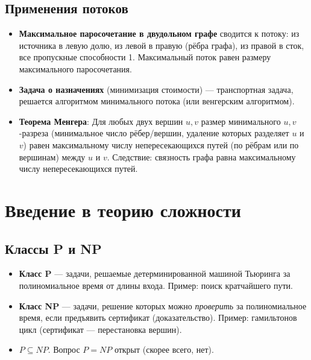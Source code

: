 \documentclass[12pt]{article}
\begin{document}
\begin{enumerate}
\subsection{Применения потоков}
\begin{itemize}
    \item \textbf{Максимальное паросочетание в двудольном графе} сводится к потоку: из источника в левую долю, из левой в правую (рёбра графа), из правой в сток, все пропускные способности 1. Максимальный поток равен размеру максимального паросочетания.
    \item \textbf{Задача о назначениях} (минимизация стоимости) — транспортная задача, решается алгоритмом минимального потока (или венгерским алгоритмом).
    \item \textbf{Теорема Менгера}: Для любых двух вершин \(u,v\) размер минимального \(u,v\)-разреза (минимальное число рёбер/вершин, удаление которых разделяет \(u\) и \(v\)) равен максимальному числу непересекающихся путей (по рёбрам или по вершинам) между \(u\) и \(v\). Следствие: связность графа равна максимальному числу непересекающихся путей.
\end{itemize}

\section{Введение в теорию сложности}
\subsection{Классы P и NP}
\begin{itemize}
    \item \textbf{Класс P} — задачи, решаемые детерминированной машиной Тьюринга за полиномиальное время от длины входа. Пример: поиск кратчайшего пути.
    \item \textbf{Класс NP} — задачи, решение которых можно \textit{проверить} за полиномиальное время, если предъявить сертификат (доказательство). Пример: гамильтонов цикл (сертификат — перестановка вершин).
    \item \(P \subseteq NP\). Вопрос \(P = NP\) открыт (скорее всего, нет).
\end{itemize}

\end{enumerate}
\end{document}

